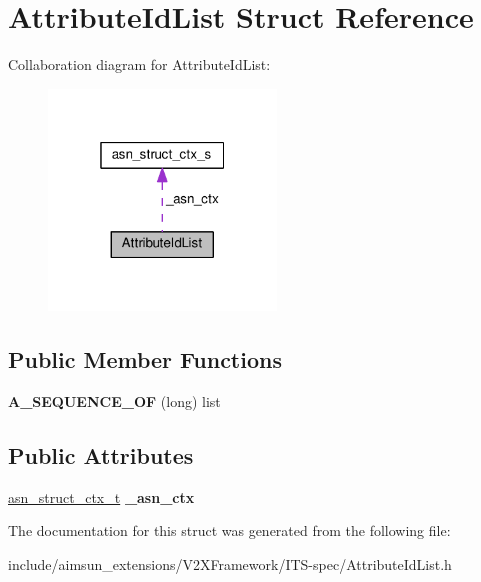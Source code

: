 \hypertarget{structAttributeIdList}{}\section{Attribute\+Id\+List Struct Reference}
\label{structAttributeIdList}


Collaboration diagram for Attribute\+Id\+List\+:\nopagebreak
\begin{figure}[H]
\begin{center}
\leavevmode
\includegraphics[width=172pt]{structAttributeIdList__coll__graph}
\end{center}
\end{figure}
\subsection*{Public Member Functions}
\begin{DoxyCompactItemize}
\item 
{\bfseries A\+\_\+\+S\+E\+Q\+U\+E\+N\+C\+E\+\_\+\+OF} (long) list\hypertarget{structAttributeIdList_a8aa113a4f3993b47a1ab56addc19cb01}{}\label{structAttributeIdList_a8aa113a4f3993b47a1ab56addc19cb01}

\end{DoxyCompactItemize}
\subsection*{Public Attributes}
\begin{DoxyCompactItemize}
\item 
\hyperlink{structasn__struct__ctx__s}{asn\+\_\+struct\+\_\+ctx\+\_\+t} {\bfseries \+\_\+asn\+\_\+ctx}\hypertarget{structAttributeIdList_af9f5beaad5241513105d367acf31537a}{}\label{structAttributeIdList_af9f5beaad5241513105d367acf31537a}

\end{DoxyCompactItemize}


The documentation for this struct was generated from the following file\+:\begin{DoxyCompactItemize}
\item 
include/aimsun\+\_\+extensions/\+V2\+X\+Framework/\+I\+T\+S-\/spec/Attribute\+Id\+List.\+h\end{DoxyCompactItemize}

